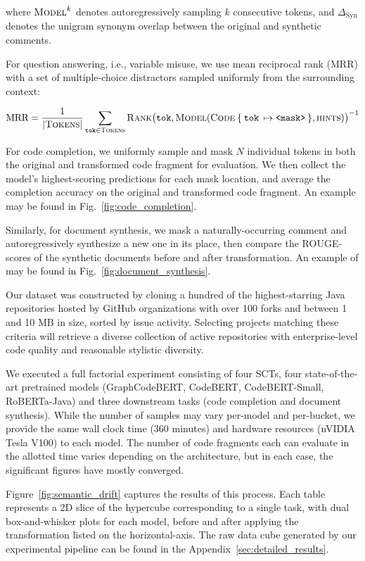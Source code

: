 \documentclass[usenames,dvipsnames]{article} %
\begin{document}
  where $\textsc{Model}^{k}$ denotes autoregressively sampling $k$ consecutive tokens, and $\Delta_\text{Syn}$ denotes the unigram synonym overlap between the original and synthetic comments.

  For question answering, i.e., variable misuse, we use mean reciprocal rank (MRR) with a set of multiple-choice distractors sampled uniformly from the surrounding context:

  \begin{equation*}
    \text{MRR} = \frac{1}{|\textsc{Tokens}|} \sum_{\texttt{tok}\in\textsc{Tokens}} \textsc{Rank}\big(\texttt{tok}, \textsc{Model}(\textsc{Code}\:\{\:\texttt{tok}\:\mapsto\texttt{<mask>}\:\}, \textsc{hints})\big)^{-1}
  \end{equation*}

  For code completion, we uniformly sample and mask $N$ individual tokens in both the original and transformed code fragment for evaluation. We then collect the model's highest-scoring predictions for each mask location, and average the completion accuracy on the original and transformed code fragment. An example may be found in Fig.~\ref{fig:code_completion}.

  Similarly, for document synthesis, we mask a naturally-occurring comment and autoregressively synthesize a new one in its place, then compare the ROUGE-scores of the synthetic documents before and after transformation. An example of may be found in Fig.~\ref{fig:document_synthesis}.

  Our dataset was constructed by cloning a hundred of the highest-starring Java repositories hosted by GitHub organizations with over 100 forks and between 1 and 10 MB in size, sorted by issue activity. Selecting projects matching these criteria will retrieve a diverse collection of active repositories with enterprise-level code quality and reasonable stylistic diversity.

  We executed a full factorial experiment consisting of four SCTs, four state-of-the-art pretrained models (GraphCodeBERT, CodeBERT, CodeBERT-Small, RoBERTa-Java) and three downstream tasks (code completion and document synthesis). While the number of samples may vary per-model and per-bucket, we provide the same wall clock time (360 minutes) and hardware resources (nVIDIA Tesla V100) to each model. The number of code fragments each can evaluate in the allotted time varies depending on the architecture, but in each case, the significant figures have mostly converged.

  Figure~\ref{fig:semantic_drift} captures the results of this process. Each table represents a 2D slice of the hypercube corresponding to a single task, with dual box-and-whisker plots for each model, before and after applying the transformation listed on the horizontal-axis. The raw data cube generated by our experimental pipeline can be found in the Appendix~\ref{sec:detailed_results}.
\end{document}
